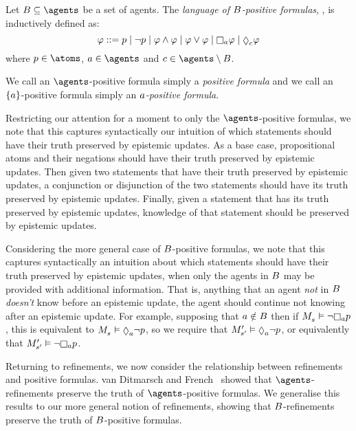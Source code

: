 \begin{definition}
Let $\agentsB \subseteq \agents$ be a set of agents.
The {\em language of $B$-positive formulas}, \langMlPlusBs{}, is inductively defined as:
$$
\phi ::= 
    \atomP \mid
    \lnot \atomP \mid
    \phi \land \phi \mid
    \phi \lor \phi \mid
    \necessaryA \phi \mid
    \possibleC \phi
$$
where $\atomP \in \atoms$, $\agentA \in \agents$ and $\agentC \in \agents \setminus \agentsB$.
\end{definition}

We call an $\agents$-positive formula simply a {\em positive formula} and we call an $\{a\}$-positive formula simply an {\em $a$-positive formula}.

Restricting our attention for a moment to only the $\agents$-positive formulas, we note that this captures syntactically our intuition of which statements should have their truth preserved by epistemic updates.
As a base case, propositional atoms and their negations should have their truth preserved by epistemic updates.
Then given two statements that have their truth preserved by epistemic updates, a conjunction or disjunction of the two statements should have its truth preserved by epistemic updates.
Finally, given a statement that has its truth preserved by epistemic updates, knowledge of that statement should be preserved by epistemic updates. 

Considering the more general case of $B$-positive formulas, we note that this captures syntactically an intuition about which statements should have their truth preserved by epistemic updates, when only the agents in $B$ may be provided with additional information.
That is, anything that an agent {\em not} in $B$ {\em doesn't} know before an epistemic update, the agent should continue not knowing after an epistemic update.
For example, supposing that $a \notin B$ then if $\kPModel{\kStateS} \entails \lnot \knowsA \atomP$, this is equivalent to $\kPModel{\kStateS} \entails \possibleA \lnot \atomP$, so we require that $\kPModelP{\kStateSP} \entails \possibleA \lnot \atomP$, or equivalently that $\kPModelP{\kStateSP} \entails \lnot \knowsA \atomP$.

Returning to refinements, we now consider the relationship between refinements and positive formulas.
van Ditmarsch and French~\cite{vanditmarsch:2009} showed that $\agents$-refinements preserve the truth of $\agents$-positive formulas.
We generalise this results to our more general notion of refinements, showing that $B$-refinements preserve the truth of $B$-positive formulas.

